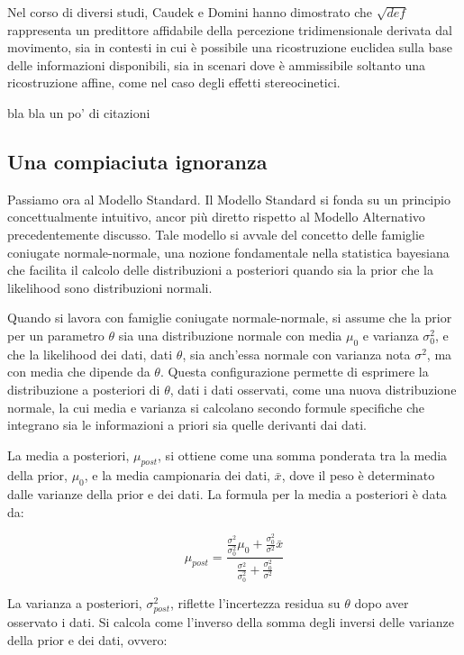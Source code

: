 \documentclass[
  man]{apa6}
\begin{document}
Nel corso di diversi studi, Caudek e Domini hanno dimostrato che \(\sqrt{def}\) rappresenta un predittore affidabile della percezione tridimensionale derivata dal movimento, sia in contesti in cui è possibile una ricostruzione euclidea sulla base delle informazioni disponibili, sia in scenari dove è ammissibile soltanto una ricostruzione affine, come nel caso degli effetti stereocinetici.

bla bla un po' di citazioni

\subsection{Una compiaciuta ignoranza}\label{una-compiaciuta-ignoranza}

Passiamo ora al Modello Standard. Il Modello Standard si fonda su un principio concettualmente intuitivo, ancor più diretto rispetto al Modello Alternativo precedentemente discusso. Tale modello si avvale del concetto delle famiglie coniugate normale-normale, una nozione fondamentale nella statistica bayesiana che facilita il calcolo delle distribuzioni a posteriori quando sia la prior che la likelihood sono distribuzioni normali.

Quando si lavora con famiglie coniugate normale-normale, si assume che la prior per un parametro \(\theta\) sia una distribuzione normale con media \(\mu_0\) e varianza \(\sigma_0^2\), e che la likelihood dei dati, dati \(\theta\), sia anch'essa normale con varianza nota \(\sigma^2\), ma con media che dipende da \(\theta\). Questa configurazione permette di esprimere la distribuzione a posteriori di \(\theta\), dati i dati osservati, come una nuova distribuzione normale, la cui media e varianza si calcolano secondo formule specifiche che integrano sia le informazioni a priori sia quelle derivanti dai dati.

La media a posteriori, \(\mu_{post}\), si ottiene come una somma ponderata tra la media della prior, \(\mu_0\), e la media campionaria dei dati, \(\bar{x}\), dove il peso è determinato dalle varianze della prior e dei dati. La formula per la media a posteriori è data da:

\[
\mu_{post} = \frac{\frac{\sigma^2}{\sigma_0^2} \mu_0 + \frac{\sigma_0^2}{\sigma^2} \bar{x}}{\frac{\sigma^2}{\sigma_0^2} + \frac{\sigma_0^2}{\sigma^2}}
\]

La varianza a posteriori, \(\sigma_{post}^2\), riflette l'incertezza residua su \(\theta\) dopo aver osservato i dati. Si calcola come l'inverso della somma degli inversi delle varianze della prior e dei dati, ovvero:
\end{document}
